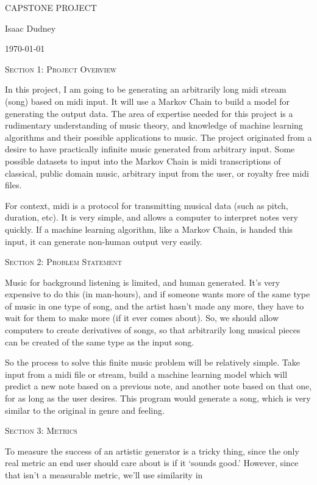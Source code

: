 \documentclass[11pt]{article}
\begin{document}
\begin{center}

{\LARGE \textsc{CAPSTONE PROJECT}}

Isaac Dudney

\today
\end{center}

\newpage

\noindent
{\large \textsc{Section 1: Project Overview}}

In this project, I am going to be generating an arbitrarily long midi stream (song) based on midi input. It will use a Markov Chain to build a model for generating the output data. The area of expertise needed for this project is a rudimentary understanding of music theory, and knowledge of machine learning algorithms and their possible applications to music. The project originated from a desire to have practically infinite music generated from arbitrary input. Some possible datasets to input into the Markov Chain is midi transcriptions of classical, public domain music, arbitrary input from the user, or royalty free midi files.

For context, midi is a protocol for transmitting musical data (such as pitch, duration, etc). It is very simple, and allows a computer to interpret notes very quickly. If a machine learning algorithm, like a Markov Chain, is handed this input, it can generate non-human output very easily.

\noindent
{\large \textsc{Section 2: Problem Statement}}

Music for background listening is limited, and human generated. It's very expensive to do this (in man-hours), and if someone wants more of the same type of music in one type of song, and the artist hasn't made any more, they have to wait for them to make more (if it ever comes about). So, we should allow computers to create derivatives of songs, so that arbitrarily long musical pieces can be created of the same type as the input song.

So the process to solve this finite music problem will be relatively simple. Take input from a midi file or stream, build a machine learning model which will predict a new note based on a previous note, and another note based on that one, for as long as the user desires. This program would generate a song, which is very similar to the original in genre and feeling.

\noindent
{\large \textsc{Section 3: Metrics}}

To measure the success of an artistic generator is a tricky thing, since the only real metric an end user should care about is if it `sounds good.' However, since that isn't a measurable metric, we'll use similarity in 
\end{document}
